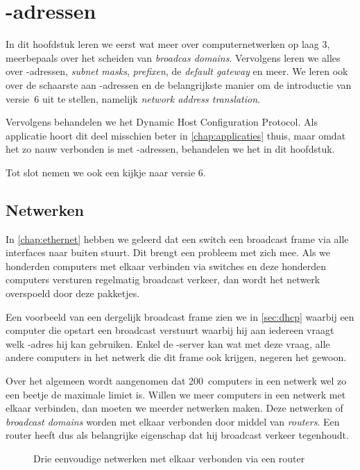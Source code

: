 \chapter{-adressen}
\label{chap:ip-addr}

In dit hoofdstuk leren we eerst wat meer over computernetwerken op laag 3, meerbepaals over het scheiden van \emph{broadcas domains}.
Vervolgens leren we alles over -adressen, \emph{subnet masks}, \emph{prefixen}, de \emph{default gateway} en meer.
We leren ook over de schaarste aan -adressen en de belangrijkste manier om de introductie van  versie~6 uit te stellen, namelijk \emph{network address translation}.

Vervolgens behandelen we het Dynamic Host Configuration Protocol.
Als applicatie hoort dit deel misschien beter in \vref{chap:applicaties} thuis, maar omdat het zo nauw verbonden is met -adressen, behandelen we het in dit hoofdstuk.

Tot slot nemen we ook een kijkje naar  versie 6.

\section{Netwerken}
In \vref{chap:ethernet} hebben we geleerd dat een switch een broadcast frame via alle interfaces naar buiten stuurt.
Dit brengt een probleem met zich mee.
Als we honderden computers met elkaar verbinden via switches en deze honderden computers versturen regelmatig broadcast verkeer, dan wordt het netwerk overspoeld door deze pakketjes.

Een voorbeeld van een dergelijk broadcast frame zien we in \vref{sec:dhcp} waarbij een computer die opstart een broadcast verstuurt waarbij hij aan iedereen vraagt welk -adres hij kan gebruiken.
Enkel de -server kan wat met deze vraag, alle andere computers in het netwerk die dit frame ook krijgen, negeren het gewoon.

Over het algemeen wordt aangenomen dat 200~computers in een netwerk wel zo een beetje de maximale limiet is.
Willen we meer computers in een netwerk met elkaar verbinden, dan moeten we meerder netwerken maken.
Deze netwerken of \emph{broadcast domains} worden met elkaar verbonden door middel van \emph{routers}.
Een router heeft dus als belangrijke eigenschap dat hij broadcast verkeer tegenhoudt.


\begin{figure}
    \centering
    
    \caption{Drie eenvoudige netwerken met elkaar verbonden via een router}
    \label{fig:router}
\end{figure}


